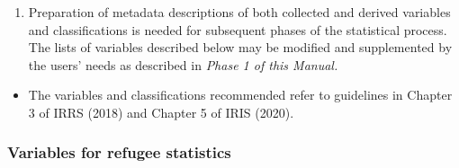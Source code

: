 \documentclass[
]{article}
\providecommand{\tightlist}{%
  \setlength{\itemsep}{0pt}\setlength{\parskip}{0pt}}
\begin{document}
\begin{enumerate}
\def\labelenumi{\arabic{enumi}.}
\setcounter{enumi}{73}
\tightlist
\item
  Preparation of metadata descriptions of both collected and derived
  variables and classifications is needed for subsequent phases of the
  statistical process. The lists of variables described below may be
  modified and supplemented by the users' needs as described in \emph{Phase
  1 of this Manual.}
\end{enumerate}

\begin{itemize}
\tightlist
\item
  The variables and classifications recommended refer to guidelines in
  Chapter 3 of IRRS (2018) and Chapter 5 of IRIS (2020).
\end{itemize}

\hypertarget{variables-for-refugee-statistics}{%
\subsubsection{Variables for refugee statistics}\label{variables-for-refugee-statistics}}
\end{document}
